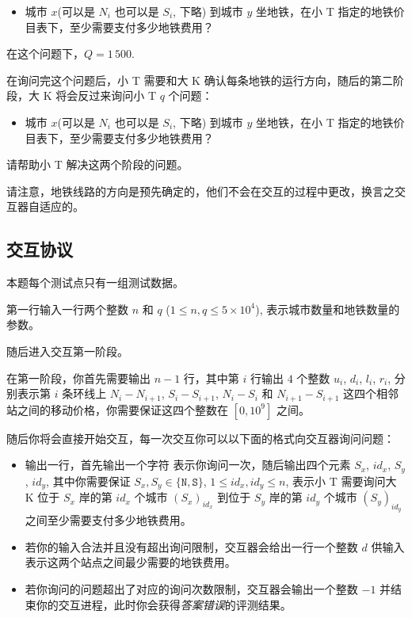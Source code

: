 \begin{itemize}
	\item 城市 $x$(可以是 $N_i$ 也可以是 $S_i$, 下略) 到城市 $y$ 坐地铁，在小 T 指定的地铁价目表下，至少需要支付多少地铁费用？
\end{itemize}

在这个问题下，$Q = 1\,500$.

在询问完这个问题后，小 T 需要和大 K 确认每条地铁的运行方向，随后的第二阶段，大 K 将会反过来询问小 T $q$ 个问题：

\begin{itemize}
	\item 城市 $x$(可以是 $N_i$ 也可以是 $S_i$, 下略) 到城市 $y$ 坐地铁，在小 T 指定的地铁价目表下，至少需要支付多少地铁费用？
\end{itemize}

请帮助小 T 解决这两个阶段的问题。

请注意，地铁线路的方向是预先确定的，他们不会在交互的过程中更改，换言之交互器自适应的。

\subsection{交互协议}

本题每个测试点只有一组测试数据。

第一行输入一行两个整数 $n$ 和 $q$ ($1 \le n, q \le 5 \times 10^4$), 表示城市数量和地铁数量的参数。

随后进入交互第一阶段。

在第一阶段，你首先需要输出 $n - 1$ 行，其中第 $i$ 行输出 $4$ 个整数 $u_i$, $d_i$, $l_i$, $r_i$, 分别表示第 $i$ 条环线上 $N_i - N_{i + 1}$, $S_i - S_{i + 1}$, $N_i - S_i$ 和 $N_{i + 1} - S_{i + 1}$ 这四个相邻站之间的移动价格，你需要保证这四个整数在 $[0, 10^9]$ 之间。

随后你将会直接开始交互，每一次交互你可以以下面的格式向交互器询问问题：

\begin{itemize}
   \item 输出一行，首先输出一个字符  表示你询问一次，随后输出四个元素 $S_x$, $id_x$, $S_y$, $id_y$, 其中你需要保证 $S_x, S_y \in \{\mathtt{N}, \mathtt{S}\}$, $1 \le id_x, id_y \le n$, 表示小 T 需要询问大 K 位于 $S_x$ 岸的第 $id_x$ 个城市 $(S_x)_{id_x}$ 到位于 $S_y$ 岸的第 $id_y$ 个城市 $(S_y)_{id_y}$ 之间至少需要支付多少地铁费用。
   \item 若你的输入合法并且没有超出询问限制，交互器会给出一行一个整数 $d$ 供输入表示这两个站点之间最少需要的地铁费用。
   \item 若你询问的问题超出了对应的询问次数限制，交互器会输出一个整数 $-1$ 并结束你的交互进程，此时你会获得\textit{答案错误}的评测结果。
\end{itemize}

